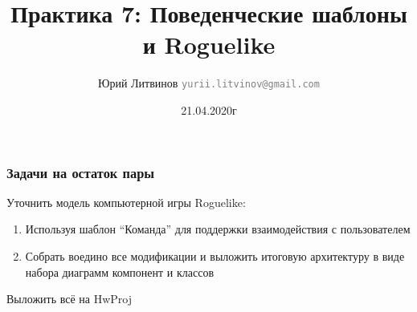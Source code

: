 \documentclass[xetex,mathserif,serif]{beamer}
\title{Практика 7: Поведенческие шаблоны и Roguelike}
\author[Юрий Литвинов]{Юрий Литвинов \newline \textcolor{gray}{\small\texttt{yurii.litvinov@gmail.com}}}
\date{21.04.2020г}
\begin{document}
	
	\frame{\titlepage}

	\begin{frame}
		\frametitle{Задачи на остаток пары}
		Уточнить модель компьютерной игры Roguelike:

		\begin{enumerate}
			\item Используя шаблон ``Команда'' для поддержки взаимодействия с пользователем
			\item Собрать воедино все модификации и выложить итоговую архитектуру в виде набора диаграмм компонент и классов
		\end{enumerate}

		Выложить всё на HwProj
	\end{frame}
\end{document}
